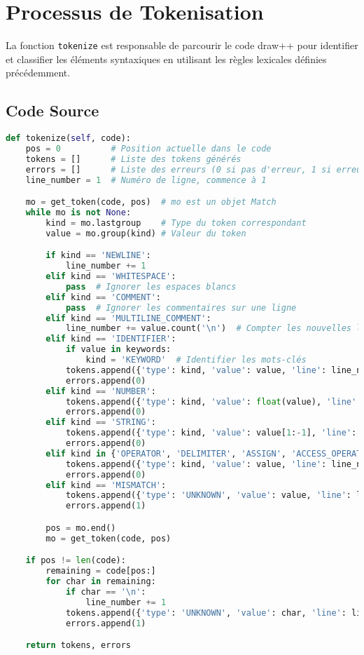 \documentclass[12pt]{article}
\begin{document}
\section{Processus de Tokenisation}
La fonction \texttt{tokenize} est responsable de parcourir le code draw++ pour identifier et classifier les éléments syntaxiques en utilisant les règles lexicales définies précédemment.

\subsection*{Code Source}
\begin{lstlisting}[language=Python, caption={Implémentation de \texttt{tokenize}}]
def tokenize(self, code):
    pos = 0          # Position actuelle dans le code
    tokens = []      # Liste des tokens générés
    errors = []      # Liste des erreurs (0 si pas d'erreur, 1 si erreur)
    line_number = 1  # Numéro de ligne, commence à 1

    mo = get_token(code, pos)  # mo est un objet Match
    while mo is not None:
        kind = mo.lastgroup    # Type du token correspondant
        value = mo.group(kind) # Valeur du token

        if kind == 'NEWLINE':
            line_number += 1
        elif kind == 'WHITESPACE':
            pass  # Ignorer les espaces blancs
        elif kind == 'COMMENT':
            pass  # Ignorer les commentaires sur une ligne
        elif kind == 'MULTILINE_COMMENT':
            line_number += value.count('\n')  # Compter les nouvelles lignes
        elif kind == 'IDENTIFIER':
            if value in keywords:
                kind = 'KEYWORD'  # Identifier les mots-clés
            tokens.append({'type': kind, 'value': value, 'line': line_number})
            errors.append(0)
        elif kind == 'NUMBER':
            tokens.append({'type': kind, 'value': float(value), 'line': line_number})
            errors.append(0)
        elif kind == 'STRING':
            tokens.append({'type': kind, 'value': value[1:-1], 'line': line_number})
            errors.append(0)
        elif kind in {'OPERATOR', 'DELIMITER', 'ASSIGN', 'ACCESS_OPERATOR'}:
            tokens.append({'type': kind, 'value': value, 'line': line_number})
            errors.append(0)
        elif kind == 'MISMATCH':
            tokens.append({'type': 'UNKNOWN', 'value': value, 'line': line_number})
            errors.append(1)

        pos = mo.end()
        mo = get_token(code, pos)

    if pos != len(code):
        remaining = code[pos:]
        for char in remaining:
            if char == '\n':
                line_number += 1
            tokens.append({'type': 'UNKNOWN', 'value': char, 'line': line_number})
            errors.append(1)

    return tokens, errors
\end{lstlisting}
\end{document}

